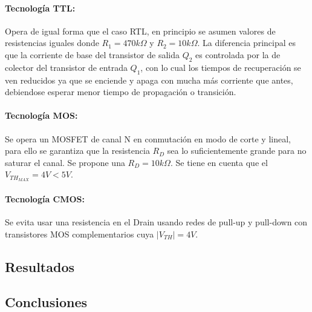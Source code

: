 \paragraph*{Tecnolog\'ia TTL:} Opera de igual forma que el caso RTL, en principio se asumen valores de resistencias iguales donde $R_1 = 470 k \Omega$ y $R_2 = 10k \Omega$. La diferencia principal es que la corriente de base del transistor de salida $Q_2$ es controlada por la de colector
del transistor de entrada $Q_1$, con lo cual los tiempos de recuperaci\'on se ven reducidos ya que se enciende y apaga con mucha m\'as corriente que antes, debiendose esperar menor tiempo de propagaci\'on o transici\'on.
\paragraph*{Tecnolog\'ia MOS:} Se opera un MOSFET de canal N en conmutaci\'on en modo de corte y lineal, para ello se garantiza que la resistencia $R_D$ sea lo suficientemente grande para no saturar el canal. Se propone una $R_D = 10k \Omega$. Se tiene en cuenta que el $V_{TH_{MAX}} = 4V < 5V$.
\paragraph*{Tecnolog\'ia CMOS:} Se evita usar una resistencia en el Drain usando redes de pull-up y pull-down con transistores MOS complementarios cuya $|V_{TH}| = 4V$.

\subsection{Resultados}
\subsection{Conclusiones}